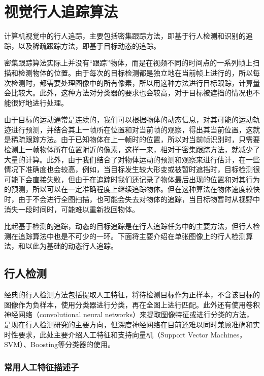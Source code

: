 
\chapter{视觉行人追踪算法}

  计算机视觉中的行人追踪，主要包括密集跟踪方法，即基于行人检测和识别的追踪，以及稀疏跟踪方法，即基于目标动态的追踪。

  密集跟踪算法实际上并没有“跟踪”物体，而是在视频不同的时间点的一系列帧上扫描和检测物体的位置。由于每次的目标检测都是独立地在当前帧上进行的，所以每次检测时，都需要处理图像中的所有像素，所以用这种方法进行目标跟踪，计算量会比较大。此外，这种方法对分类器的要求也会较高，对于目标被遮挡的情况也不能很好地进行处理。

  由于目标的运动通常是连续的，我们可以根据物体的动态信息，对其可能的运动轨迹进行预测，并结合其上一帧所在位置和对当前帧的观察，得出其当前位置，这就是稀疏跟踪方法。由于已知物体在上一帧时的位置，所以对当前帧识别时，只需要检测上一帧物体所在位置附近的像素，这样一来，相对于密集跟踪方法，就减少了大量的计算。此外，由于我们结合了对物体运动的预测和观察来进行估计，在一些情况下准确度也会较高，例如，当目标发生较大形变或被暂时遮挡时，目标检测很可能下会直接失败，但由于在追踪时我们还记录了物体最后出现的位置和对其行为的预测，所以可以在一定准确程度上继续追踪物体。但在这种算法在物体速度较快时，由于不会进行全图扫描，也可能会失去对物体的追踪，当目标物暂时从视野中消失一段时间时，可能难以重新找回物体。

  比起基于检测的追踪，动态的目标追踪是在行人追踪任务中的主要方法，但行人检测在追踪算法中也是不可少的一环。下面将主要介绍在单张图像上的行人检测算法，和以此为基础的动态行人追踪。

\section{行人检测}

  经典的行人检测方法包括提取人工特征，将待检测目标作为正样本，不含该目标的图像作为负样本，使用分类器进行分类，再在全图上进行匹配。此外还有使用卷积神经网络（convolutional neural networks）来提取图像特征或进行分类的方法，是现在行人检测研究的主要方向，但深度神经网络在目前还难以同时兼顾准确和实时性要求，此处主要介绍人工特征和支持向量机（Support Vector Machines，SVM）、Boosting等分类器的使用。

\subsection{常用人工特征描述子}

